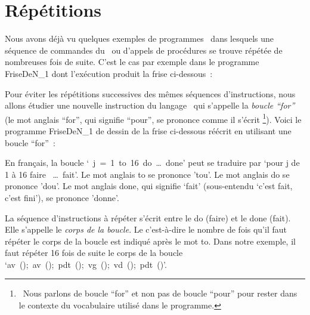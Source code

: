 \section{Répétitions}

Nous avons déjà vu quelques exemples de programmes \ocaml\ dans lesquels une
séquence de commandes du \robot\ ou d'appels de procédures se trouve répétée de
nombreuses fois de suite. C'est le cas par exemple dans le programme {\idt FriseDeN\_1}
dont l'exécution produit la frise ci-dessous~:

\vspace*{8mm}%
\noindent{}
\vspace*{-1cm}%


Pour éviter les répétitions successives des mêmes séquences d'ins\-truc\-tions,
nous allons étudier une nouvelle instruction du langage \ocaml\ qui s'appelle la
{\em boucle ``for''} (le mot anglais ``for'', qui signifie ``pour'',
se prononce comme il s'écrit%
\footnote{\ Nous parlons de boucle ``for'' et non pas de boucle ``pour'' pour rester dans le
contexte du vocabulaire utilisé dans le programme.}). Voici le
programme {\idt FriseDeN\_1} de dessin de la frise ci-dessous
réécrit en utilisant une boucle ``for''~:

\vspace*{8mm}%
\noindent{}
\vspace*{-1cm}%
\label{prog:FriseDeN_2}


\noindent En français, la boucle `{\ j\ =\ 1\ {\mcl to}\ 16\ {\mcl do}\ \ldots\ {\mcl done}}'
peut se traduire par  `pour j de 1 à 16 faire \ \ldots \ fait'. Le mot anglais {\mcl to} se prononce 'tou'. Le mot
anglais {\mcl do} se prononce 'dou'. Le mot anglais {\mcl done}, qui signifie `fait'
(sous-entendu `c'est fait, c'est fini'), se prononce 'donne'.

La séquence d'instructions à répéter s'écrit entre le {\mcl do} (faire) et le {\mcl done} (fait). Elle s'appelle le
{\em corps de la boucle}. Le  c'est-à-dire le
nombre de fois qu'il faut répéter le corps de la boucle est indiqué
après le mot {\mcl to}. Dans notre exemple, il faut répéter 16 fois
de suite le corps de la boucle  `{\idt  av\ ();\ av\ ();\ pdt\ ();\ vg\ ();\ vd\ ();\ pdt\ ()}'.

